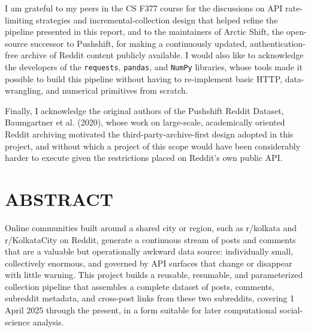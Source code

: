 \documentclass[12pt]{article}
\begin{document}
I am grateful to my peers in the CS F377 course for the discussions on API rate-limiting
strategies and incremental-collection design that helped refine the pipeline presented in this
report, and to the maintainers of Arctic Shift, the open-source successor to Pushshift, for
making a continuously updated, authentication-free archive of Reddit content publicly available.
I would also like to acknowledge the developers of the \texttt{requests}, \texttt{pandas}, and
\texttt{NumPy} libraries, whose tools made it possible to build this pipeline without having to
re-implement basic HTTP, data-wrangling, and numerical primitives from scratch.

Finally, I acknowledge the original authors of the Pushshift Reddit Dataset, Baumgartner et al.
(2020), whose work on large-scale, academically oriented Reddit archiving motivated the
third-party-archive-first design adopted in this project, and without which a project of this
scope would have been considerably harder to execute given the restrictions placed on Reddit's
own public API.

\section*{ABSTRACT}

Online communities built around a shared city or region, such as r/kolkata and r/KolkataCity on
Reddit, generate a continuous stream of posts and comments that are a valuable but
operationally awkward data source: individually small, collectively enormous, and governed by
API surfaces that change or disappear with little warning. This project builds a reusable,
resumable, and parameterized collection pipeline that assembles a complete dataset of posts,
comments, subreddit metadata, and cross-post links from these two subreddits, covering 1 April
2025 through the present, in a form suitable for later computational social-science analysis.
\end{document}
